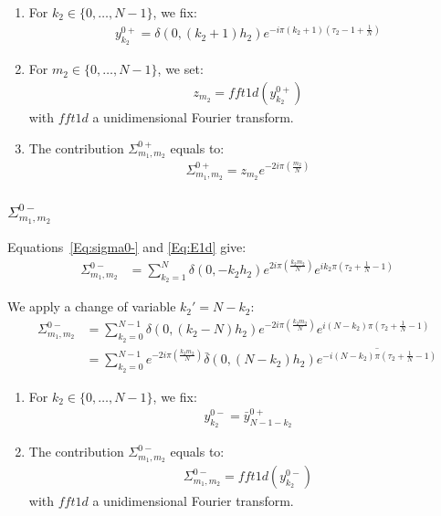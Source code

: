\begin{enumerate}
\item For $k_2\in\{0,\hdots,N-1\}$, we fix:
\begin{align*}
y^{0+}_{k_2}= \delta(0,(k_2+1)h_2)e^{-i\pi (k_2+1)\left(\tau_2-1+\frac{1}{N}\right)}
\end{align*}
\item For $m_2\in\{0,\hdots,N-1\}$, we set:
\begin{align*}
  z_{m_2}=fft1d(y^{0+}_{k_2})
\end{align*}
with $fft1d$ a unidimensional Fourier transform.
\item The contribution $\Sigma_{m_1,m_2}^{0+}$ equals to:
\begin{align*}
  \Sigma_{m_1,m_2}^{0+}=z_{m_2}e^{-2i\pi\left(\frac{m_2}{N}\right)}
\end{align*}
\end{enumerate}

\subsubsection{\texorpdfstring{$\Sigma_{m_1,m_2}^{0-}$}{sigma0-}}
Equations~\eqref{Eq:sigma0-} and \eqref{Eq:E1d} give:
\begin{align*}
\Sigma_{m_1,m_2}^{0-}&=\sum_{k_2=1}^{N}\delta\left(0,-k_2h_2\right)
    e^{2i\pi\left(\frac{k_2m_2}{N}\right)}
    e^{ik_2\pi\left(\tau_2+\frac{1}{N}-1\right)}
\end{align*}

We apply a change of variable $k_2'=N-k_2$:
\begin{align*}
\Sigma_{m_1,m_2}^{0-}&=\sum_{k_2=0}^{N-1}
  \delta\left(0,(k_2-N)h_2\right) e^{-2i\pi\left(\frac{k_2m_2}{N}\right)}
    e^{i(N-k_2)\pi\left(\tau_2+\frac{1}{N}-1\right)} \\
 &=\sum_{k_2=0}^{N-1}
    e^{-2i\pi\left(\frac{k_2m_2}{N}\right)}
  \bar{\delta}\left(0,(N-k_2)h_2\right)
   \overline{e^{-i(N-k_2)\pi\left(\tau_2+\frac{1}{N}-1\right)}}
\end{align*}

\begin{enumerate}
\item For $k_2\in\{0,\hdots,N-1\}$, we fix:
\begin{align*}
y^{0-}_{k_2}= \bar{y}^{0+}_{N-1-k_2}
\end{align*}
\item The contribution $\Sigma_{m_1,m_2}^{0-}$ equals to:
\begin{align*}
  \Sigma_{m_1,m_2}^{0-}=fft1d(y^{0-}_{k_2})
\end{align*}
with $fft1d$ a unidimensional Fourier transform.
\end{enumerate}

